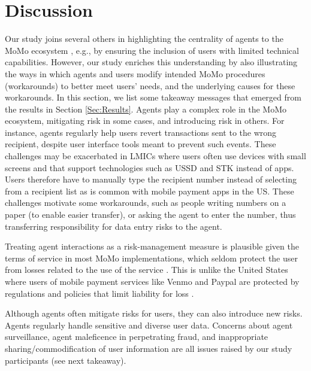 \section{Discussion}
\label {Sec:discussion}
Our study joins several others in highlighting the centrality of agents to the MoMo ecosystem \cite{mogaji2022dark}, e.g., by ensuring the inclusion of users with limited technical capabilities. However, our study enriches this understanding by also illustrating the ways in which agents and users modify intended MoMo procedures (workarounds) to better meet users' needs, and the underlying causes for these workarounds.
In this section, we list some takeaway messages that emerged from the results in Section \ref{Sec:Results}. 
 Agents play a complex role in the MoMo ecosystem, mitigating risk in some cases, and introducing risk in others. For instance, agents regularly help users revert transactions sent to the wrong recipient, despite user interface tools meant to prevent such events. These challenges may be exacerbated in LMICs where users often use devices with small screens and that support technologies such as USSD and STK instead of apps. Users therefore have to manually type the recipient number instead of selecting from a recipient list as is common with mobile payment apps in the US. These challenges motivate some workarounds, such as people writing numbers on a paper (to enable easier transfer), or asking the agent to enter the number,
thus transferring responsibility for data entry risks to the agent. 
 
Treating agent interactions as a risk-management measure is plausible given the terms of service in most MoMo implementations, which seldom protect the user from losses related to the use of the service \cite{bowers2017regulators}. This is unlike the United States where users of mobile payment services like Venmo and Paypal are protected by regulations and policies that limit liability for loss \cite{bowers2017regulators}.

Although agents often mitigate risks for users, they can also introduce new risks. 
Agents regularly handle sensitive and diverse user data. Concerns about agent surveillance, agent maleficence in perpetrating fraud, and inappropriate sharing/commodification of user information are all issues raised by our study participants (see next takeaway). 

